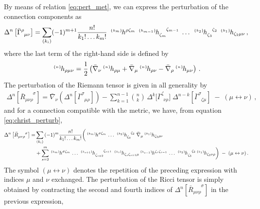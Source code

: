 \documentclass[notitlepage,onecolumn,floatfix,preprintnumbers,aps,prd,showpacs,nofootinbib,amsmath,amssymb,amsfonts]{revtex4-1}
\newcommand{\BarChristoffel}[3]{\bar{\Gamma}^{#1}_{\phantom{#1} #2 #3}}
\newcommand{\be}{\begin{equation}}
\newcommand{\ee}{\end{equation}}
\newcommand{\<}{\langle}
\renewcommand{\>}{\rangle}
\newcommand{\pert}[2]{{}^{\mbox{\,\tiny $\{#1\}\!$}}{#2}}
\begin{document}
By means of relation \eqref{eq:pert_met}, we can express the perturbation of 
the connection components as \cite{Brizuela:2008ra}
\be
	\Delta^{n} \left[ \BarChristoffel{\rho}{\mu}{\nu} \right]
		= \sum_{(k_i)} (-1)^{m+1} \frac{n!}{k_1! \dots k_m!} \, \, 
		\pert{k_m}{h^{\rho \zeta_m}} \; \pert{k_{m-1}}{h_{\zeta_m}^{\phantom{\zeta_m} \zeta_{m-1}}} 
		\; \dots \; 
		\pert{k_2}{h_{\zeta_3}^{\phantom{\zeta_3} \zeta_2}} \; \pert{k_1}{h_{\zeta_2 \mu \nu}} \, , 
	\label{eq:christ_perturb}
\ee
where the last term of the right-hand side is defined by 
\be
	\pert{n}{h_{\rho \mu \nu}} 
		= \frac{1}{2} \left(\bar \nabla_\nu
                  \pert{n}{h_{\rho \mu}} + \bar \nabla_\mu \pert{n}{h_{\rho
                    \nu}} - \bar \nabla_\rho \pert{n}{h_{\mu  \nu}} \right) \, . 
\ee
The perturbation of the Riemann tensor is given in all generality by 
\begin{align}
	\Delta^{n} \left[ \bar R_{\mu \nu \rho}^{\phantom{\mu \nu \rho} \sigma} \right]
		= \bar \nabla_\nu \left( \Delta^{n} \left[ \BarChristoffel{\sigma}{\mu}{\rho} \right]\right) 
		- \sum_{k=1}^{n-1} \binom{n}{k} \, \Delta^k \Big[ 
                \BarChristoffel{\zeta}{\nu}{\rho} \Big] 
		\; \Delta^{n-k} \left[ \BarChristoffel{\sigma}{\zeta}{\mu} \right] 
		\; - \; (\mu \leftrightarrow \nu) \, , 
\end{align}
and for a connection compatible with the metric, we have, from equation \eqref{eq:christ_perturb}, 
\begin{align}
	\Delta^{n} \left[\bar R_{\mu \nu \rho}^{\phantom{\mu \nu \rho} \sigma} \right]
		= & \sum_{(k_i)} \, (-1)^m \frac{n!}{k_1! \dots k_m!} 
	        \bigg( \pert{k_m}{h^{\sigma \zeta_m}} \, \dots \, \pert{k_2}{h_{\zeta_3}^{\phantom{\zeta_3} \zeta_2}}\;
		\bar \nabla_\mu \pert{k_1}{h_{\zeta_2 \rho \nu}} \\
		& + \sum_{s=2}^{m}
		\pert{k_m}{h^{\sigma \zeta_m}} \, \dots \, 
		\pert{k_{s+1}}{h_{\zeta_{s+2}}^{\phantom{\zeta_{s+2}} \zeta_{s+1}}} \; 
		\pert{k_s}{h_{\zeta_s \zeta_{s+1} \mu}}
		\pert{k_{s-1}}{h^{\zeta_s \zeta_{s-1}}} \, \dots \, 
		\pert{k_2}{h_{\zeta_3}^{\phantom{\zeta_3} \zeta_2}}
		\pert{k_1}{h_{\zeta_2 \nu \rho}} \bigg) 
		\; - \; (\mu \leftrightarrow \nu) \, . \nonumber
\end{align}
The symbol $(\mu \leftrightarrow \nu)$ denotes the repetition of the preceding expression with indices $\mu$ and $\nu$ exchanged. 
The perturbation of the Ricci tensor is simply obtained by contracting  the second and fourth indices of 
$\Delta^{n} \left[ \bar R_{\mu \nu \rho}^{\phantom{\mu \nu \rho} \sigma} \right]$ in the previous expression, 
\end{document}

